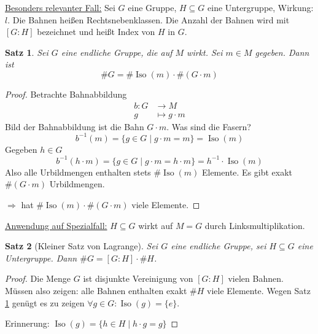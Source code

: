 \documentclass[a4paper,12pt,numbers=noenddot,parskip=full]{scrartcl}
\newcommand{\heading}{\underline}
\theoremstyle{dotless}
\newtheorem{theorem}{Satz}[section]
\theoremstyle{remark}
\begin{document}
	\heading{Besonders relevanter Fall:} Sei $G$ eine Gruppe, $H \subseteq G$ eine Untergruppe, Wirkung: $l$. Die Bahnen heißen Rechtsnebenklassen. Die Anzahl der Bahnen wird mit $[G:H]$ bezeichnet und heißt Index von $H$ in $G$.
	
	\begin{theorem}
		\label{thm:4_4}
		Sei $G$ eine endliche Gruppe, die auf $M$ wirkt. Sei $m \in M$ gegeben. Dann ist
		\begin{equation*}
			\#G = \#\operatorname{Iso}(m) \cdot \#(G \cdot m)
		\end{equation*}
	\end{theorem}
	\begin{proof}
		Betrachte Bahnabbildung
		\begin{align*}
			b: G &\longrightarrow M \\
			g &\longmapsto g \cdot m
		\end{align*}
		Bild der Bahnabbildung ist die Bahn $G \cdot m$. Was sind die Fasern?
		\begin{equation*}
			b^{-1}(m) = \{ g \in G \mid g \cdot m = m \} = \operatorname{Iso}(m)
		\end{equation*}
		Gegeben $h \in G$
		\begin{equation*}
			b^{-1}(h \cdot m) = \{ g \in G \mid g \cdot m = h \cdot m \} = h^{-1} \cdot \operatorname{Iso}(m)
		\end{equation*}
		Also alle Urbildmengen enthalten stets $\#\operatorname{Iso}(m)$ Elemente. Es gibt exakt $\#(G \cdot m)$ Urbildmengen.
		
		$\Rightarrow$ hat $\#\operatorname{Iso}(m) \cdot \#(G \cdot m)$ viele Elemente.
	\end{proof}

	\heading{Anwendung auf Spezialfall:} $H \subseteq G$ wirkt auf $M = G$ durch Linksmultiplikation.
	
	\begin{theorem}[Kleiner Satz von Lagrange]
		Sei $G$ eine endliche Gruppe, sei $H \subseteq G$ eine Untergruppe. Dann $\#G = [G:H] \cdot \#H$.
	\end{theorem}

	\begin{proof}
		Die Menge $G$ ist disjunkte Vereinigung von $[G:H]$ vielen Bahnen. Müssen also zeigen: alle Bahnen enthalten exakt $\#H$ viele Elemente. Wegen Satz \ref{thm:4_4} genügt es zu zeigen $\forall g \in G: \operatorname{Iso}(g) = \{ e \}$.
		
		Erinnerung: $\operatorname{Iso}(g) = \{ h \in H \mid h \cdot g = g \}$
	\end{proof}
\end{document}
